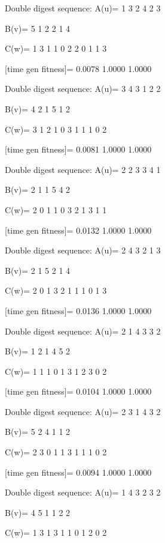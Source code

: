 Double digest sequence:
A(u)=
     1     3     2     4     2     3

B(v)=
     5     1     2     2     1     4

C(w)=
     1     3     1     1     0     2     2     0     1     1     3

[time gen fitness]=
    0.0078    1.0000    1.0000

Double digest sequence:
A(u)=
     3     4     3     1     2     2

B(v)=
     4     2     1     5     1     2

C(w)=
     3     1     2     1     0     3     1     1     1     0     2

[time gen fitness]=
    0.0081    1.0000    1.0000

Double digest sequence:
A(u)=
     2     2     3     3     4     1

B(v)=
     2     1     1     5     4     2

C(w)=
     2     0     1     1     0     3     2     1     3     1     1

[time gen fitness]=
    0.0132    1.0000    1.0000

Double digest sequence:
A(u)=
     2     4     3     2     1     3

B(v)=
     2     1     5     2     1     4

C(w)=
     2     0     1     3     2     1     1     1     0     1     3

[time gen fitness]=
    0.0136    1.0000    1.0000

Double digest sequence:
A(u)=
     2     1     4     3     3     2

B(v)=
     1     2     1     4     5     2

C(w)=
     1     1     1     0     1     3     1     2     3     0     2

[time gen fitness]=
    0.0104    1.0000    1.0000

Double digest sequence:
A(u)=
     2     3     1     4     3     2

B(v)=
     5     2     4     1     1     2

C(w)=
     2     3     0     1     1     3     1     1     1     0     2

[time gen fitness]=
    0.0094    1.0000    1.0000

Double digest sequence:
A(u)=
     1     4     3     2     3     2

B(v)=
     4     5     1     1     2     2

C(w)=
     1     3     1     3     1     1     0     1     2     0     2


